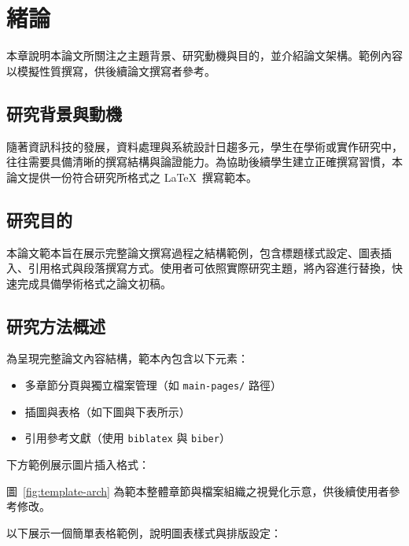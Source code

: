 \chapter{緒論}

本章說明本論文所關注之主題背景、研究動機與目的，並介紹論文架構。範例內容以模擬性質撰寫，供後續論文撰寫者參考。

\section{研究背景與動機}

隨著資訊科技的發展，資料處理與系統設計日趨多元，學生在學術或實作研究中，往往需要具備清晰的撰寫結構與論證能力。為協助後續學生建立正確撰寫習慣，本論文提供一份符合研究所格式之 \LaTeX~撰寫範本。

\section{研究目的}

本論文範本旨在展示完整論文撰寫過程之結構範例，包含標題樣式設定、圖表插入、引用格式與段落撰寫方式。使用者可依照實際研究主題，將內容進行替換，快速完成具備學術格式之論文初稿。

\section{研究方法概述}

為呈現完整論文內容結構，範本內包含以下元素：

\begin{itemize}
  \item 多章節分頁與獨立檔案管理（如 \texttt{main-pages/} 路徑）
  \item 插圖與表格（如下圖與下表所示）
  \item 引用參考文獻（使用 \texttt{biblatex} 與 \texttt{biber}）
\end{itemize}

下方範例展示圖片插入格式：


圖~\ref{fig:template-arch} 為範本整體章節與檔案組織之視覺化示意，供後續使用者參考修改。

以下展示一個簡單表格範例，說明圖表樣式與排版設定：


